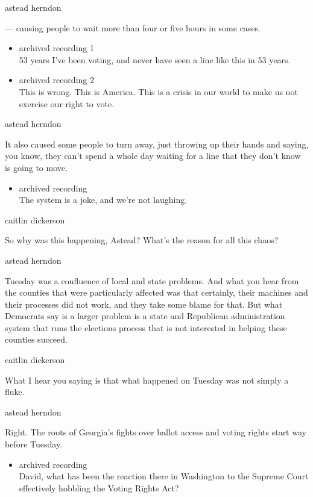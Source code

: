 astead herndon

--- causing people to wait more than four or five hours in some cases.

\begin{itemize}
\item
  archived recording 1\\
  53 years I've been voting, and never have seen a line like this in 53
  years.
\item
  archived recording 2\\
  This is wrong. This is America. This is a crisis in our world to make
  us not exercise our right to vote.
\end{itemize}

astead herndon

It also caused some people to turn away, just throwing up their hands
and saying, you know, they can't spend a whole day waiting for a line
that they don't know is going to move.

\begin{itemize}
\tightlist
\item
  archived recording\\
  The system is a joke, and we're not laughing.
\end{itemize}

caitlin dickerson

So why was this happening, Astead? What's the reason for all this chaos?

astead herndon

Tuesday was a confluence of local and state problems. And what you hear
from the counties that were particularly affected was that certainly,
their machines and their processes did not work, and they take some
blame for that. But what Democrats say is a larger problem is a state
and Republican administration system that runs the elections process
that is not interested in helping these counties succeed.

caitlin dickerson

What I hear you saying is that what happened on Tuesday was not simply a
fluke.

astead herndon

Right. The roots of Georgia's fights over ballot access and voting
rights start way before Tuesday.

\begin{itemize}
\tightlist
\item
  archived recording\\
  David, what has been the reaction there in Washington to the Supreme
  Court effectively hobbling the Voting Rights Act?
\end{itemize}

